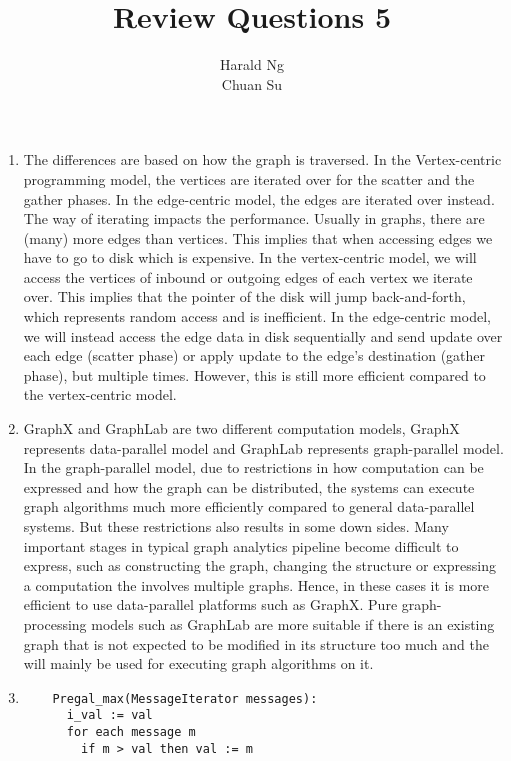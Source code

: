 \documentclass[12pt]{article}
\begin{document}
\title{Review Questions 5}
\author{Harald Ng \\
        Chuan Su}

\maketitle
\begin{enumerate}
    \item The differences are based on how the graph is traversed. In the Vertex-centric programming model, the vertices are iterated over for the scatter and the gather phases. In the edge-centric model, the edges are iterated over instead. The way of iterating impacts the performance. Usually in graphs, there are (many) more edges than vertices. This implies that when accessing edges we have to go to disk which is expensive. In the vertex-centric model, we will access the vertices of inbound or outgoing edges of each vertex we iterate over. This implies that the pointer of the disk will jump back-and-forth, which represents random access and is inefficient. In the edge-centric model, we will instead access the edge data in disk sequentially and send update over each edge (scatter phase) or apply update to the edge's destination (gather phase), but multiple times. However, this is still more efficient compared to the vertex-centric model.
    
    \item GraphX and GraphLab are two different computation models, GraphX represents data-parallel model and GraphLab represents graph-parallel model. In the graph-parallel model, due to restrictions in how computation can be expressed and how the graph can be distributed, the systems can execute graph algorithms much more efficiently compared to general data-parallel systems. But these restrictions also results in some down sides. Many important stages in typical graph analytics pipeline become difficult to express, such as constructing the graph, changing the structure or expressing a computation the involves multiple graphs. Hence, in these cases it is more efficient to use data-parallel platforms such as GraphX. Pure graph-processing models such as GraphLab are more suitable if there is an existing graph that is not expected to be modified in its structure too much and the will mainly be used for executing graph algorithms on it.
    
	\item
	\begin{verbatim}
	Pregal_max(MessageIterator messages):
	  i_val := val
	  for each message m
	    if m > val then val := m
			

\end{verbatim}
\end{enumerate}
\end{document}
